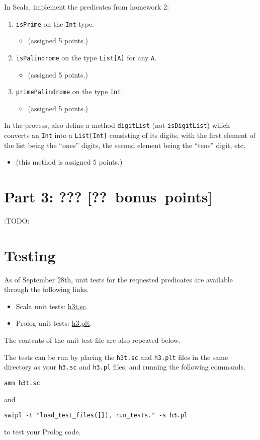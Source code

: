 \documentclass[11pt]{article}
\begin{document}
In Scala, implement the predicates from homework 2:
\begin{enumerate}
\item \texttt{isPrime} on the \texttt{Int} type.
\begin{itemize}
\item (assigned 5 points.)
\end{itemize}
\item \texttt{isPalindrome} on the type \texttt{List[A]} for any \texttt{A}.
\begin{itemize}
\item (assigned 5 points.)
\end{itemize}
\item \texttt{primePalindrome} on the type \texttt{Int}.
\begin{itemize}
\item (assigned 5 points.)
\end{itemize}
\end{enumerate}

In the process, also define a method \texttt{digitList} (not \texttt{isDigitList})
which converts an \texttt{Int} into a \texttt{List[Int]} consisting
of its digits, with the first element of the list being
the “ones” digits, the second element being the “tens” digit, etc.
\begin{itemize}
\item (this method is assigned 5 points.)
\end{itemize}

\section*{Part 3: ??? [?? bonus points]}
\label{sec:org52e85c1}
:TODO:

\section*{Testing}
\label{sec:org995ecea}
As of September 28th, unit tests for the requested predicates
are available through the following links.
\begin{itemize}
\item Scala unit tests: \href{./testing/h3/h3.plt}{h3t.sc}.
\item Prolog unit tests: \href{./testing/h3/h3.plt}{h3.plt}.
\end{itemize}
The contents of the unit test file are also repeated below.

The tests can be run by placing the \texttt{h3t.sc} and \texttt{h3.plt} files
in the same directory as your \texttt{h3.sc} and \texttt{h3.pl} files, and
running the following commands.
\begin{verbatim}
amm h3t.sc
\end{verbatim}
and
\begin{verbatim}
swipl -t "load_test_files([]), run_tests." -s h3.pl
\end{verbatim}
to test your Prolog code.
\end{document}
